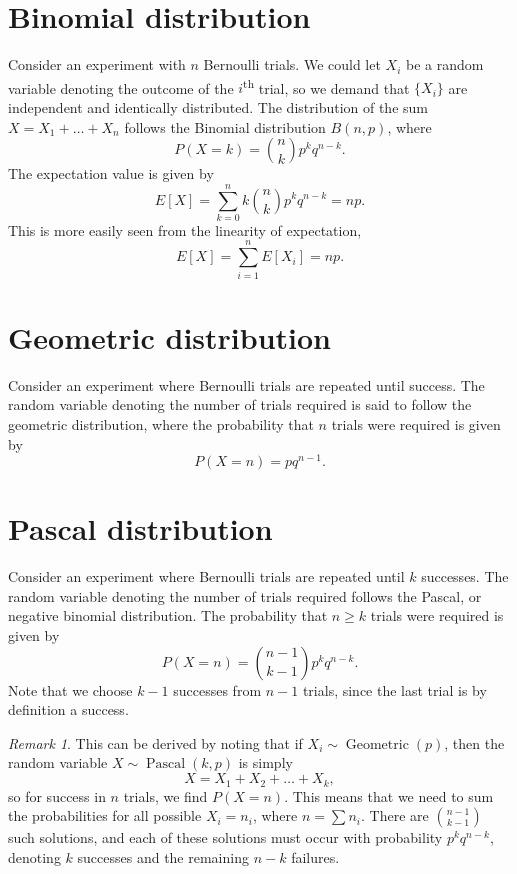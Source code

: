 \documentclass[11pt]{article}
\newcommand\E[1]{E[#1]}
\theoremstyle{definition}
\theoremstyle{remark}
\newtheorem*{remark}{Remark}
\numberwithin{equation}{module}
\begin{document}
    \section*{Binomial distribution}
    Consider an experiment with $n$ Bernoulli trials. We could let $X_i$ be a
    random variable denoting the outcome of the $i$\textsuperscript{th} trial, so
    we demand that $\{X_i\}$ are independent and identically distributed.
    The distribution of the sum $X = X_1 + \dots + X_n$ follows the Binomial
    distribution $B(n, p)$, where \[
        P(X = k) = \binom{n}{k}p^kq^{n-k}.
    \] The expectation value is given by \[
        \E{X} = \sum_{k = 0}^n k\binom{n}{k}p^kq^{n - k} = np.
    \] This is more easily seen from the linearity of expectation, \[
        \E{X} = \sum_{i = 1}^n \E{X_i} = np.
    \] 

    \section*{Geometric distribution}
    Consider an experiment where Bernoulli trials are repeated until success. The
    random variable denoting the number of trials required is said to follow the
    geometric distribution, where the probability that $n$ trials were required is
    given by \[
        P(X = n) = pq^{n - 1}.
    \] 

    \section*{Pascal distribution}
    Consider an experiment where Bernoulli trials are repeated until $k$ successes.
    The random variable denoting the number of trials required follows the Pascal,
    or negative binomial distribution. The probability that $n \geq k$ trials were
    required is given by \[
        P(X = n) = \binom{n - 1}{k - 1}p^k q^{n - k}.
    \] Note that we choose $k - 1$ successes from $n - 1$ trials, since the last
    trial is by definition a success.

    \begin{remark}
        This can be derived by noting that if $X_i \sim
        \operatorname{Geometric}(p)$, then the random variable $X \sim
        \operatorname{Pascal}(k, p)$ is simply \[
            X = X_1 + X_2 + \dots + X_k,
        \] so for success in $n$ trials, we find $P(X = n)$. This means that we need
        to sum the probabilities for all possible $X_i = n_i$, where $n = \sum n_i$.
        There are $\binom{n - 1}{k - 1}$ such solutions, and each of these solutions
        must occur with probability $p^k q^{n - k}$, denoting $k$ successes and the
        remaining $n - k$ failures.
    \end{remark}
\end{document}
